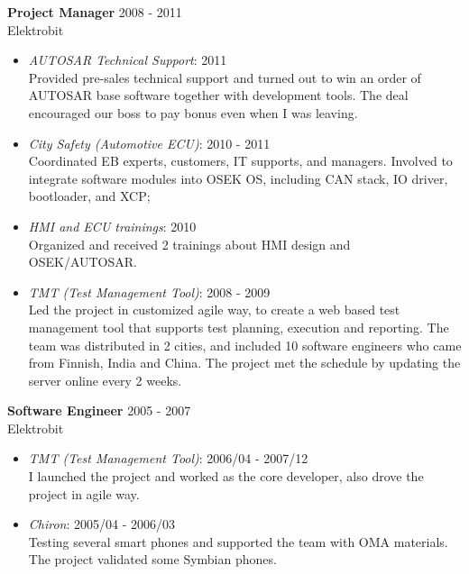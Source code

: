 \textbf{Project Manager} \hfill 2008 - 2011\\
        Elektrobit
        \begin{itemize}  \itemsep -2pt %
            \item {\em AUTOSAR Technical Support}: 2011 \\
                    Provided pre-sales technical support
                    and turned out to win an order of AUTOSAR base software together with development tools.
                    The deal encouraged our boss to pay bonus even when I was leaving.
            \item {\em City Safety (Automotive ECU)}: 2010 - 2011 \\
                    Coordinated EB experts, customers, IT supports, and managers.
                    Involved to integrate software modules into OSEK OS,
                    including CAN stack, IO driver, bootloader, and XCP;
            \item {\em HMI and ECU trainings}: 2010\\
                Organized and received 2 trainings about HMI design and OSEK/AUTOSAR.
            \item {\em TMT (Test Management Tool)}: 2008 - 2009 \\
                    Led the project in customized agile way,
                    to create a web based test management tool
                    that supports test planning, execution and reporting.
                    The team was distributed in 2 cities,
                    and included 10 software engineers who came from Finnish, India and China.
                    The project met the schedule by updating the server online every 2 weeks.
        \end{itemize}
 
\textbf{Software Engineer} \hfill 2005 - 2007 \\
        Elektrobit
        \begin{itemize}  \itemsep -2pt %
            \item {\em TMT (Test Management Tool)}: 2006/04 - 2007/12 \\ 
            I launched the project and worked as the core developer, also drove
            the project in agile way.
            \item {\em Chiron}: 2005/04 - 2006/03 \\
                Testing several smart phones and supported the team with OMA materials.
                The project validated some Symbian phones.
        \end{itemize}
 
